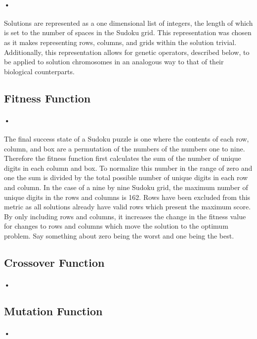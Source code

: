 \documentclass[10pt]{article}
\begin{document}
\paragraph{•}
Solutions are represented as a one dimensional list of integers, the length of which is set to the number of spaces in the Sudoku grid. This representation was chosen as it makes representing rows, columns, and grids within the solution trivial. Additionally, this representation allows for genetic operators, described below, to be applied to solution chromosomes in an analogous way to that of their biological counterparts. 
\subsection{Fitness Function}
\paragraph{•}
The final success state of a Sudoku puzzle is one where the contents of each row, column, and box are a permutation of the numbers of the numbers one to nine. Therefore the fitness function first calculates the sum of the number of unique digits in each column and box. To normalize this number in the range of zero and one the sum is divided by the total possible number of unique digits in each row and column. In the case of a nine by nine Sudoku grid, the maximum number of unique digits in the rows and columns is 162. Rows have been excluded from this metric as all solutions already have valid rows which present the maximum score. By only including rows and columns, it increases the change in the fitness value for changes to rows and columns which move the solution to the optimum problem. Say something about zero being the worst and one being the best.


\subsection{Crossover Function}
\paragraph{•}
\subsection{Mutation Function}
\paragraph{•}
\end{document}
